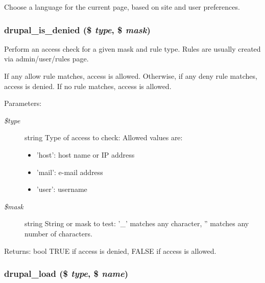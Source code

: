 Choose a language for the current page, based on site and user preferences. \hypertarget{bootstrap_8inc_81a621ba76a61bc21124da331cc7e4af}{
\subsubsection[{drupal\_\-is\_\-denied}]{\setlength{\rightskip}{0pt plus 5cm}drupal\_\-is\_\-denied (\$ {\em type}, \/  \$ {\em mask})}}
\label{bootstrap_8inc_81a621ba76a61bc21124da331cc7e4af}


Perform an access check for a given mask and rule type. Rules are usually created via admin/user/rules page.

If any allow rule matches, access is allowed. Otherwise, if any deny rule matches, access is denied. If no rule matches, access is allowed.

\begin{Desc}
\item[Parameters:]
\begin{description}
\item[{\em \$type}]string Type of access to check: Allowed values are:\begin{itemize}
\item 'host': host name or IP address\item 'mail': e-mail address\item 'user': username \end{itemize}
\item[{\em \$mask}]string String or mask to test: '\_\-' matches any character, '' matches any number of characters. \end{description}
\end{Desc}
\begin{Desc}
\item[Returns:]bool TRUE if access is denied, FALSE if access is allowed. \end{Desc}
\hypertarget{bootstrap_8inc_13a2254228f213a980dc1f09886b8802}{
\subsubsection[{drupal\_\-load}]{\setlength{\rightskip}{0pt plus 5cm}drupal\_\-load (\$ {\em type}, \/  \$ {\em name})}}
\label{bootstrap_8inc_13a2254228f213a980dc1f09886b8802}


